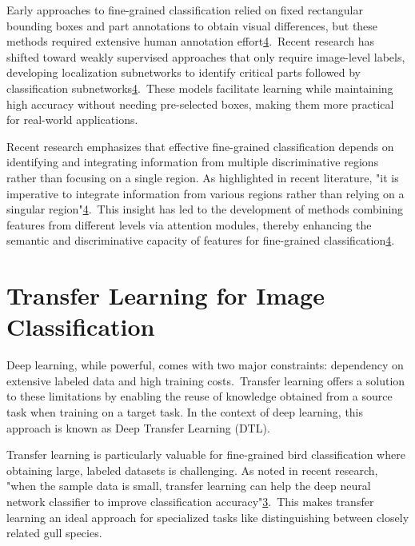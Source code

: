 \documentclass[a4paper,12pt]{article}
\begin{document}
Early approaches to fine-grained classification relied on fixed rectangular bounding boxes and part annotations to obtain visual differences, but these methods required extensive human annotation effort\href{https://www.frontiersin.org/journals/neurorobotics/articles/10.3389/fnbot.2024.1391791/full}{4}. Recent research has shifted toward weakly supervised approaches that only require image-level labels, developing localization subnetworks to identify critical parts followed by classification subnetworks\href{https://www.frontiersin.org/journals/neurorobotics/articles/10.3389/fnbot.2024.1391791/full}{4}. These models facilitate learning while maintaining high accuracy without needing pre-selected boxes, making them more practical for real-world applications.

Recent research emphasizes that effective fine-grained classification depends on identifying and integrating information from multiple discriminative regions rather than focusing on a single region. As highlighted in recent literature, "it is imperative to integrate information from various regions rather than relying on a singular region"\href{https://www.frontiersin.org/journals/neurorobotics/articles/10.3389/fnbot.2024.1391791/full}{4}. This insight has led to the development of methods combining features from different levels via attention modules, thereby enhancing the semantic and discriminative capacity of features for fine-grained classification\href{https://www.frontiersin.org/journals/neurorobotics/articles/10.3389/fnbot.2024.1391791/full}{4}.

\section*{Transfer Learning for Image Classification}
Deep learning, while powerful, comes with two major constraints: dependency on extensive labeled data and high training costs\cite{iman2022review}. Transfer learning offers a solution to these limitations by enabling the reuse of knowledge obtained from a source task when training on a target task. In the context of deep learning, this approach is known as Deep Transfer Learning (DTL)\cite{iman2022review}.

Transfer learning is particularly valuable for fine-grained bird classification where obtaining large, labeled datasets is challenging. As noted in recent research, "when the sample data is small, transfer learning can help the deep neural network classifier to improve classification accuracy"\href{https://ijece.iaescore.com/index.php/IJECE/article/view/24833}{3}. This makes transfer learning an ideal approach for specialized tasks like distinguishing between closely related gull species.
\end{document}
